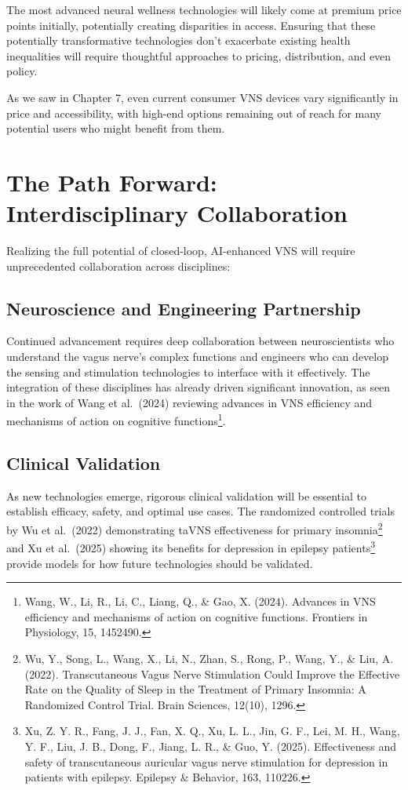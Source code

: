 \documentclass[
  Letterpaper,
]{scrbook}
\begin{document}
The most advanced neural wellness technologies will likely come at
premium price points initially, potentially creating disparities in
access. Ensuring that these potentially transformative technologies
don't exacerbate existing health inequalities will require thoughtful
approaches to pricing, distribution, and even policy.

As we saw in Chapter 7, even current consumer VNS devices vary
significantly in price and accessibility, with high-end options
remaining out of reach for many potential users who might benefit from
them.

\section{The Path Forward: Interdisciplinary
Collaboration}\label{the-path-forward-interdisciplinary-collaboration}

Realizing the full potential of closed-loop, AI-enhanced VNS will
require unprecedented collaboration across disciplines:

\subsection{Neuroscience and Engineering
Partnership}\label{neuroscience-and-engineering-partnership}

Continued advancement requires deep collaboration between
neuroscientists who understand the vagus nerve's complex functions and
engineers who can develop the sensing and stimulation technologies to
interface with it effectively. The integration of these disciplines has
already driven significant innovation, as seen in the work of Wang et
al.~(2024) reviewing advances in VNS efficiency and mechanisms of action
on cognitive functions\footnote{Wang, W., Li, R., Li, C., Liang, Q., \&
  Gao, X. (2024). Advances in VNS efficiency and mechanisms of action on
  cognitive functions. Frontiers in Physiology, 15, 1452490.}.

\subsection{Clinical Validation}\label{clinical-validation}

As new technologies emerge, rigorous clinical validation will be
essential to establish efficacy, safety, and optimal use cases. The
randomized controlled trials by Wu et al.~(2022) demonstrating taVNS
effectiveness for primary insomnia\footnote{Wu, Y., Song, L., Wang, X.,
  Li, N., Zhan, S., Rong, P., Wang, Y., \& Liu, A. (2022).
  Transcutaneous Vagus Nerve Stimulation Could Improve the Effective
  Rate on the Quality of Sleep in the Treatment of Primary Insomnia: A
  Randomized Control Trial. Brain Sciences, 12(10), 1296.} and Xu et
al.~(2025) showing its benefits for depression in epilepsy
patients\footnote{Xu, Z. Y. R., Fang, J. J., Fan, X. Q., Xu, L. L., Jin,
  G. F., Lei, M. H., Wang, Y. F., Liu, J. B., Dong, F., Jiang, L. R., \&
  Guo, Y. (2025). Effectiveness and safety of transcutaneous auricular
  vagus nerve stimulation for depression in patients with epilepsy.
  Epilepsy \& Behavior, 163, 110226.} provide models for how future
technologies should be validated.
\end{document}
